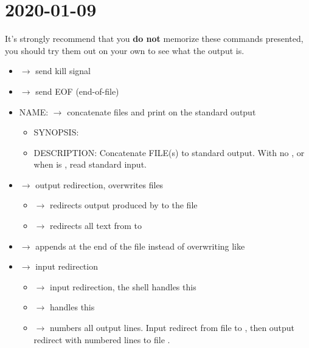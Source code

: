 \section{2020-01-09}
It's strongly recommend that you \textbf{do not} memorize these commands presented,
you should try them out on your own to see what the output is.

\begin{itemize}
      \item {} $ \rightarrow $ send kill signal
      \item {} $ \rightarrow $ send EOF (end-of-file)
      \item NAME\@:  $ \rightarrow $ concatenate files and print on the standard output
            \begin{itemize}
                  \item SYNOPSIS\@: 
                  \item DESCRIPTION\@: Concatenate FILE(s) to standard output.
                        With no , or when  is \code{-}, read standard input.
            \end{itemize}
      \item \code{>} $ \rightarrow $ output redirection, overwrites files
            \begin{itemize}
                  \item {} $ \rightarrow $ redirects output produced by
                         to the file 
                  \item {} $ \rightarrow $ redirects all text from
                         to 
            \end{itemize}
      \item \code{>{}>} $ \rightarrow $ appends at the end of the file instead of overwriting like
            \code{>}
      \item \code{<} $ \rightarrow $ input redirection
            \begin{itemize}
                  \item {} $ \rightarrow $
                        input redirection, the shell handles this
                  \item {} $ \rightarrow $
                         handles this
                  \item {} $ \rightarrow $
                         numbers all output lines. Input redirect from file  to
                        , then output redirect with numbered lines to file .
            \end{itemize}
\end{itemize}

